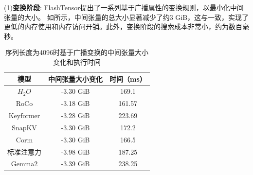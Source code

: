 (1)\textbf{变换阶段}:
FlashTensor提出了一系列基于广播属性的变换规则，以最小化中间张量的大小。
如所示，中间张量的总大小显著减少了约3 GiB，这与一致，实现了更低的内存使用和内存访问开销。此外，变换阶段的搜索成本非常小，约为数百毫秒。


\begin{table}[ht]
    \centering
    \caption{序列长度为4096时基于广播变换的中间张量大小变化和执行时间}
    \begin{tabular}{ccc}
       \toprule
       模型  & 中间张量大小变化 & 时间（ms） \\
       \hline
       \(H_{2}O\)  & -3.30 GiB & 169.1 \\
       RoCo  & -3.18 GiB & 161.57 \\
       Keyformer  & -3.28 GiB & 223.69 \\
       SnapKV  & -3.30 GiB & 172.2 \\
       Corm  & -3.30 GiB & 166.5 \\
       标准注意力  & -3.98 GiB & 187.25 \\
       Gemma2  & -3.39 GiB & 238.25 \\
       \bottomrule
    \end{tabular}
    \label{tab:transform}
\end{table}

